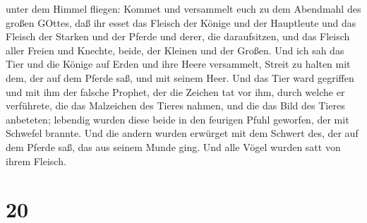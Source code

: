 unter dem Himmel fliegen: Kommet und versammelt euch zu dem Abendmahl
des großen GOttes,  daß ihr esset das Fleisch der Könige
und der Hauptleute und das Fleisch der Starken und der Pferde und derer,
die daraufsitzen, und das Fleisch aller Freien und Knechte, beide, der
Kleinen und der Großen.  Und ich sah das Tier und die
Könige auf Erden und ihre Heere versammelt, Streit zu halten mit dem,
der auf dem Pferde saß, und mit seinem Heer.  Und das Tier
ward gegriffen und mit ihm der falsche Prophet, der die Zeichen tat vor
ihm, durch welche er verführete, die das Malzeichen des Tieres nahmen,
und die das Bild des Tieres anbeteten; lebendig wurden diese beide in
den feurigen Pfuhl geworfen, der mit Schwefel brannte.  Und
die andern wurden erwürget mit dem Schwert des, der auf dem Pferde saß,
das aus seinem Munde ging. Und alle Vögel wurden satt von ihrem Fleisch.

\hypertarget{section-18}{%
\section{20}\label{section-18}}

